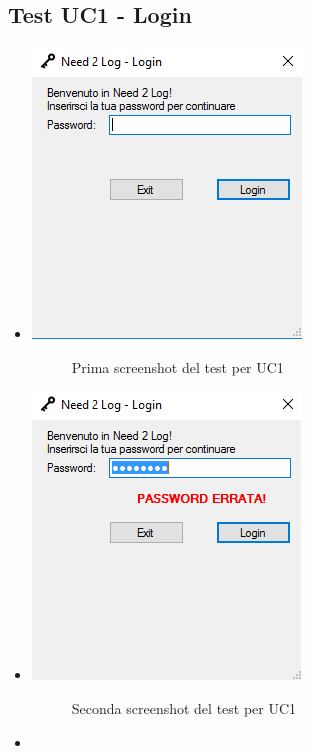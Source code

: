 \documentclass[a4paper,10pt]{report}
\begin{document}
			\subsection{Test UC1 - Login}
				\begin{itemize}
					\item[] {
						\begin{center}
							\includegraphics[scale=1]{immagini/test/testUC1_1.png}
							\end{center}
						\begin{figure}[!h]
								\caption{Prima screenshot del test per UC1}
							\end{figure}}
					\item[] {
						\begin{center}
							\includegraphics[scale=1]{immagini/test/testUC1_2.png}
							\end{center}
						\begin{figure}[!h]
								\caption{Seconda screenshot del test per UC1}
							\end{figure}}
					\item[] {
}
\end{itemize}
\end{document}
